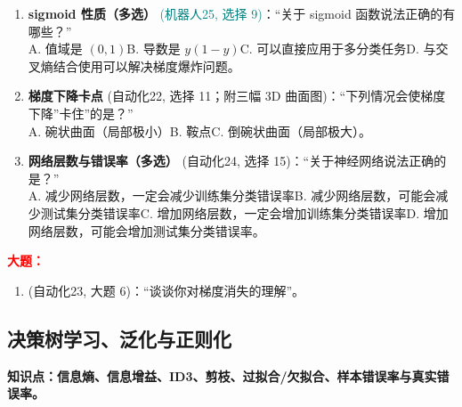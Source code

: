 ﻿\documentclass[../main.tex]{subfiles}
\begin{document}
\begin{enumerate}[itemsep=0.45em, topsep=0.2em, leftmargin=1.5em]
    \item \textbf{sigmoid 性质（多选）} \textcolor{teal}{(机器人25, 选择 9)}：``关于 sigmoid 函数说法正确的有哪些？''\\
    A. 值域是 $(0,1)$\quad B. 导数是 $y(1-y)$\quad C. 可以直接应用于多分类任务\quad D. 与交叉熵结合使用可以解决梯度爆炸问题。 

    \item \textbf{梯度下降卡点} \textcolor{autoclassgreen}{(自动化22, 选择 11；附三幅 3D 曲面图)}：``下列情况会使梯度下降''卡住''的是？''\\
    A. 碗状曲面（局部极小）\quad B. 鞍点\quad C. 倒碗状曲面（局部极大）\quad {}。 

    \item \textbf{网络层数与错误率（多选）} \textcolor{autoclassgreen}{(自动化24, 选择 15)}：``关于神经网络说法正确的是？''\\
    A. 减少网络层数，一定会减少训练集分类错误率\quad B. 减少网络层数，可能会减少测试集分类错误率\quad C. 增加网络层数，一定会增加训练集分类错误率\quad D. 增加网络层数，可能会增加测试集分类错误率。 
\end{enumerate}

\noindent\textbf{\textcolor{red}{大题：}}
\begin{enumerate}[itemsep=0.3em, topsep=0.2em, leftmargin=1.5em]
    \item \textcolor{autoclassgreen}{(自动化23, 大题 6)}：``谈谈你对梯度消失的理解''。 
\end{enumerate}

\subsection{决策树学习、泛化与正则化}

\noindent\textbf{知识点：信息熵、信息增益、ID3、剪枝、过拟合/欠拟合、样本错误率与真实错误率。}
\end{document}
